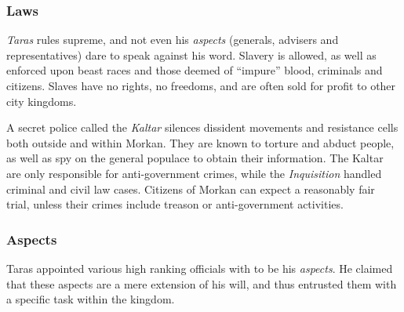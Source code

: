 \subsubsection*{Laws}

\emph{Taras} rules supreme, and not even his \emph{aspects} (generals,
advisers and representatives) dare to speak against his word. Slavery is
allowed, as well as enforced upon beast races and those deemed of ``impure''
blood, criminals and citizens. Slaves have no rights, no freedoms, and are
often sold for profit to other city kingdoms.

A secret police called the \emph{Kaltar} silences dissident movements and
resistance cells both outside and within Morkan. They are known to torture and
abduct people, as well as spy on the general populace to obtain their
information. The Kaltar are only responsible for anti-government crimes, while
the \emph{Inquisition} handled criminal and civil law cases. Citizens of
Morkan can expect a reasonably fair trial, unless their crimes include treason
or anti-government activities.

\subsubsection*{Aspects}


Taras appointed various high ranking officials with to be his \emph{aspects}.
He claimed that these aspects are a mere extension of his will, and thus
entrusted them with a specific task within the kingdom.

